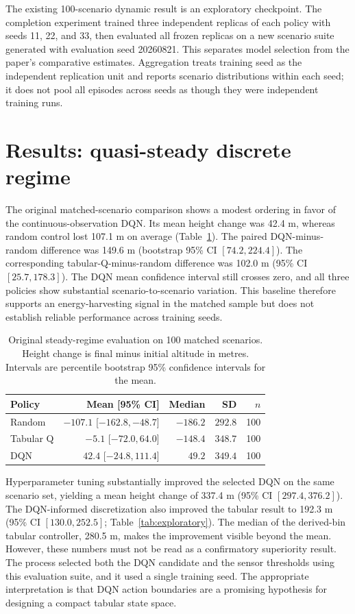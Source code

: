 \documentclass{article}
\begin{document}
The existing 100-scenario dynamic result is an exploratory checkpoint.  The
completion experiment trained three independent replicas of each policy with
seeds 11, 22, and 33, then evaluated all frozen replicas on a new scenario
suite generated with evaluation seed 20260821.  This separates model selection
from the paper's comparative estimates.  Aggregation treats training seed as
the independent replication unit and reports scenario distributions within each
seed; it does not pool all episodes across seeds as though they were independent
training runs.

\section{Results: quasi-steady discrete regime}
\label{sec:steady_results}

The original matched-scenario comparison shows a modest ordering in favor of
the continuous-observation DQN.  Its mean height change was 42.4 m, whereas
random control lost 107.1 m on average (Table~\ref{tab:steady_baseline}).  The
paired DQN-minus-random difference was 149.6 m (bootstrap 95\% CI
$[74.2,224.4]$).  The corresponding tabular-Q-minus-random difference was
102.0 m (95\% CI $[25.7,178.3]$).  The DQN mean confidence interval still
crosses zero, and all three policies show substantial scenario-to-scenario
variation.  This baseline therefore supports an energy-harvesting signal in the
matched sample but does not establish reliable performance across training
seeds.

\begin{table}[t]
  \caption{Original steady-regime evaluation on 100 matched scenarios. Height
  change is final minus initial altitude in metres. Intervals are percentile
  bootstrap 95\% confidence intervals for the mean.}
  \label{tab:steady_baseline}
  \centering
  \small
  \begin{tabular}{lrrrr}
    \toprule
    Policy & Mean [95\% CI] & Median & SD & $n$ \\
    \midrule
    Random & $-107.1$ [$-162.8,-48.7$] & $-186.2$ & $292.8$ & 100 \\
    Tabular Q & $-5.1$ [$-72.0,64.0$] & $-148.4$ & $348.7$ & 100 \\
    DQN & $42.4$ [$-24.8,111.4$] & $49.2$ & $349.4$ & 100 \\
    \bottomrule
  \end{tabular}
\end{table}

Hyperparameter tuning substantially improved the selected DQN on the same
scenario set, yielding a mean height change of 337.4 m (95\% CI
$[297.4,376.2]$).  The DQN-informed discretization also improved the tabular
result to 192.3 m (95\% CI $[130.0,252.5]$; Table~\ref{tab:exploratory}).  The
median of the derived-bin tabular controller, 280.5 m, makes the improvement
visible beyond the mean.  However, these numbers must not be read as a
confirmatory superiority result.  The process selected both the DQN candidate
and the sensor thresholds using this evaluation suite, and it used a single
training seed.  The appropriate interpretation is that DQN action boundaries
are a promising hypothesis for designing a compact tabular state space.
\end{document}
